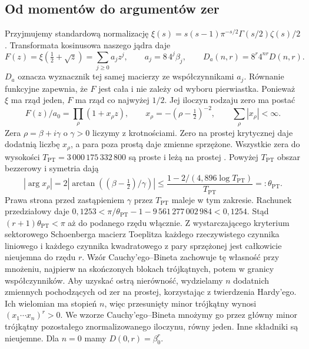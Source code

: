 \documentclass[11pt,a4paper,reqno]{amsart}
\numberwithin{equation}{section}
\begin{document}
\subsection{Od momentów do argumentów zer}\label{sec:sector}
Przyjmujemy standardową normalizację \(\xi(s)=s(s-1)\pi^{-s/2}\Gamma(s/2)\zeta(s)/2\). Transformata kosinusowa naszego jądra \cite{nuttall,rt} daje
\[
 F(z)=\xi(\tfrac12+\sqrt z)=\sum_{j\ge0}a_jz^j,\qquad a_j=8\,4^j\beta_j,\qquad
 D_a(n,r)=8^r4^{nr}D(n,r).
\]
\(D_a\) oznacza wyznacznik tej samej macierzy ze współczynnikami \(a_j\). Równanie funkcyjne zapewnia, że \(F\) jest cała i nie zależy od wyboru pierwiastka. Ponieważ \(\xi\) ma rząd jeden, \(F\) ma rząd co najwyżej \(1/2\). Jej iloczyn rodzaju zero ma postać
\[
 F(z)/a_0=\prod_{\rho}(1+x_\rho z),\qquad
 x_\rho=-(\rho-\tfrac12)^{-2},\qquad \sum_{\rho}|x_\rho|<\infty.
\]
Zera \(\rho=\beta+i\gamma\) o \(\gamma>0\) liczymy z krotnościami. Zero na prostej krytycznej daje dodatnią liczbę \(x_\rho\), a para poza prostą daje zmienne sprzężone. Wszystkie zera do wysokości \(T_{\mathrm{PT}}=3\,000\,175\,332\,800\) są proste i leżą na prostej \cite[twierdzenie~1 i \S2]{pt}. Powyżej \(T_{\mathrm{PT}}\) obszar bezzerowy \cite{bty} i symetria dają
\[
 |\arg x_\rho|=2|\arctan((\beta-\tfrac12)/\gamma)|
 \le\frac{1-2/(4{,}896\log T_{\mathrm{PT}})}{T_{\mathrm{PT}}}=:\theta_{\mathrm{PT}} .
\]
Prawa strona przed zastąpieniem \(\gamma\) przez \(T_{\mathrm{PT}}\) maleje w tym zakresie. Rachunek przedziałowy daje \(0{,}1253<\pi/\theta_{\mathrm{PT}}-1-9\,561\,277\,002\,984<0{,}1254\). Stąd \((r+1)\theta_{\mathrm{PT}}<\pi\) aż do podanego rzędu włącznie. Z wystarczającego kryterium sektorowego Schoenberga \cite[twierdzenie~30.27]{khare} macierz Toeplitza każdego rzeczywistego czynnika liniowego i każdego czynnika kwadratowego z pary sprzężonej jest całkowicie nieujemna do rzędu \(r\). Wzór Cauchy'ego--Bineta zachowuje tę własność przy mnożeniu, najpierw na skończonych blokach trójkątnych, potem w granicy współczynników. Aby uzyskać ostrą nierówność, wydzielamy \(n\) dodatnich zmiennych pochodzących od zer na prostej, korzystając z twierdzenia Hardy'ego. Ich wielomian ma stopień \(n\), więc przesunięty minor trójkątny wynosi \((x_1\cdots x_n)^r>0\). We wzorze Cauchy'ego--Bineta mnożymy go przez główny minor trójkątny pozostałego znormalizowanego iloczynu, równy jeden. Inne składniki są nieujemne. Dla \(n=0\) mamy \(D(0,r)=\beta_0^r\).
\end{document}

